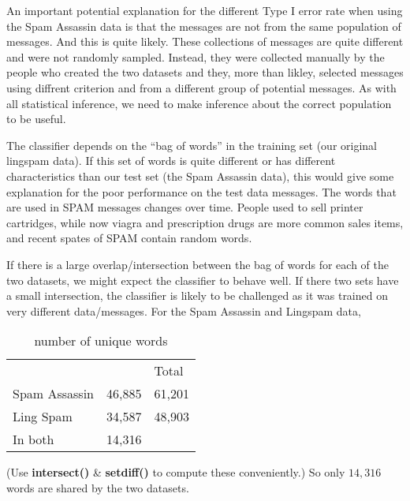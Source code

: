 \documentclass{article}
\def\SFunction#1{\textbf{#1()}}
\begin{document}
An important potential explanation for the different Type I error rate
when using the Spam Assassin data is that the messages are not from
the same population of messages.  And this is quite likely. These
collections of messages are quite different and were not randomly
sampled.  Instead, they were collected manually by the people who
created the two datasets and they, more than likley, selected messages
using diffrent criterion and from a different group of potential
messages.  As with all statistical inference, we need to make
inference about the correct population to be useful.

The classifier depends on the ``bag of words'' in the training set
(our original lingspam data).  If this set of words is quite different
or has different characteristics than our test set (the Spam Assassin
data), this would give some explanation for the poor performance on
the test data messages.  The words that are used in SPAM messages
changes over time.  People used to sell printer cartridges, while now
viagra and prescription drugs are more common sales items, and recent
spates of SPAM contain random words.

If there is a large overlap/intersection between the bag of words for
each of the two datasets, we might expect the classifier to behave
well. If there two sets have a small intersection, the classifier is
likely to be challenged as it was trained on very different
data/messages.  For the Spam Assassin and Lingspam data, 

\begin{table}[htbp]
  \begin{center}
    \leavevmode
\begin{tabular}{lll}
   & & Total  \\
Spam Assassin  & 46,885  & 61,201 \\
Ling Spam &  34,587 & 48,903 \\
In both &   14,316 & \\
\end{tabular}
\caption{number of unique words}
  \end{center}
\end{table}
(Use \SFunction{intersect} \& \SFunction{setdiff} to compute these conveniently.)
So only $14, 316$ words are shared by the two datasets.
\end{document}
